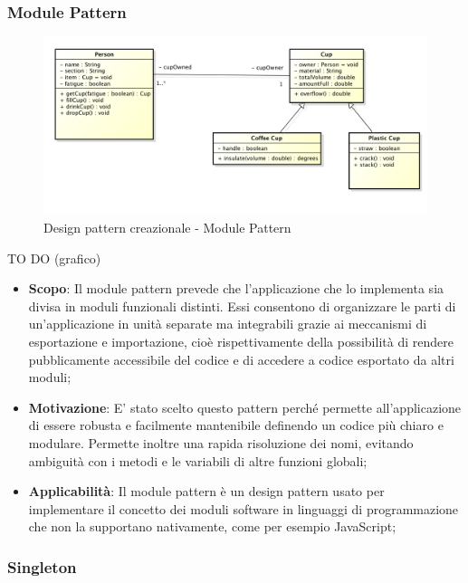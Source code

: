 		
		\newpage
		\subsubsection{Module Pattern} %
		
		
		\begin{figure}[htbp]
			\centering
			\centerline{\includegraphics[scale=0.3]{./images/example_graph.png}}
			\caption{Design pattern creazionale - Module Pattern}
		\end{figure}
		TO DO (grafico)
		
		
		\begin{itemize}
			\item \textbf{Scopo}: Il module pattern prevede che l'applicazione che lo implementa sia divisa in moduli funzionali distinti. Essi consentono di organizzare le parti di un’applicazione in unità separate ma integrabili grazie ai meccanismi di esportazione e importazione, cioè rispettivamente della possibilità di rendere pubblicamente accessibile del codice e di accedere a codice esportato da altri moduli;
			
			\item \textbf{Motivazione}: E' stato scelto questo pattern perché permette all'applicazione di essere robusta e facilmente mantenibile definendo un codice più chiaro e modulare. Permette inoltre una rapida risoluzione dei nomi, evitando ambiguità con i metodi e le variabili di altre funzioni globali;
			
			\item \textbf{Applicabilità}: Il module pattern è un design pattern usato per implementare il concetto dei moduli software in linguaggi di programmazione che non la supportano nativamente, come per esempio JavaScript;
			
		\end{itemize}


		\newpage
		\subsubsection{Singleton} %
		
